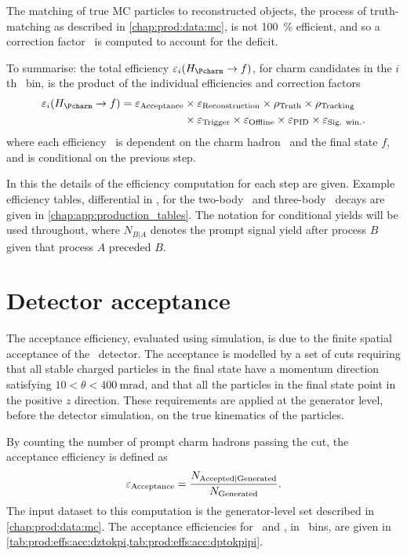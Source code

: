 The matching of true \ac{MC} particles to reconstructed objects, the process of
truth-matching as described in \cref{chap:prod:data:mc}, is not \SI{100}{\%}
efficient, and so a correction factor \efftruth\ is computed to account for
the deficit.

To summarise: the total efficiency $\eff_{i}(\decay{\PHc}{f})$, for charm
candidates in the $i$th \pTy\ bin, is the product of the individual
efficiencies and correction factors
\begin{align}
  \eff_{i}(\decay{\PHc}{f}) = \effacc &\times \effreco \times \efftruth \times \efftracking \nonumber\\
                                      &\times \efftrig \times \effoffline \times \effpid \times \effsigwin.
  \label{eqn:prod:effs:total_eff}
\end{align}
where each efficiency \eff\ is dependent on the charm hadron \PHc\ and the
final state $f$, and is conditional on the previous step.

In this  the details of the efficiency computation
for each step are given.
Example efficiency tables, differential in \pTy, for the
two-body \DzToKpi\ and three-body \DpToKpipi\ decays are given in
\cref{chap:app:production_tables}.
The notation for conditional yields will be used throughout, where $N_{B|A}$
denotes the prompt signal yield after process $B$ given that process $A$
preceded $B$.

\section{Detector acceptance}
\label{chap:prod:effs:acc}

The acceptance efficiency, evaluated using simulation, is due to the finite
spatial acceptance of the \lhcb\ detector.
The acceptance is modelled by a set of cuts requiring that all stable charged
particles in the final state have a momentum direction satisfying $10 < \theta
< \SI{400}{\milli\radian}$, and that all the particles in the final state point
in the positive $z$ direction.
These requirements are applied at the generator level, before the detector
simulation, on the true kinematics of the particles.

By counting the number of prompt charm hadrons passing the cut, the acceptance
efficiency is defined as
\begin{equation}
  \effacc = \frac{%
    N_{\text{Accepted}|\text{Generated}}
  }
  {%
    N_{\text{\text{Generated}}}
  }.
  \label{eqn:prod:effs:acc}
\end{equation}
The input dataset to this computation is the generator-level set described in
\cref{chap:prod:data:mc}.
The acceptance efficiencies for \DzToKpi\ and \DpToKpipi, in \pTy\ bins, are
given in \cref{tab:prod:effs:acc:dztokpi,tab:prod:effs:acc:dptokpipi}.

